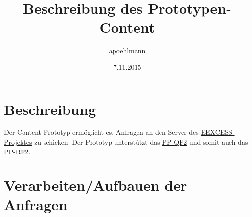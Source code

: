 
\title{Beschreibung des Prototypen-Content}
\author{apoehlmann}
\date{7.11.2015}


\pagebreak

\section{Beschreibung}
Der Content-Prototyp ermöglicht es, Anfragen an den Server des  
\href{https://github.com/EEXCESS/eexcess/wiki}{EEXCESS-Projektes} zu schicken.
Der Prototyp unterstützt das \href{https://github.com/EEXCESS/eexcess/wiki/%5B21.09.2015%5D-Request-and-Response-format#pp-query-format}{PP-QF2}
und somit auch das \href{https://github.com/EEXCESS/eexcess/wiki/%5B21.09.2015%5D-Request-and-Response-format#pp-response-format}{PP-RF2}.

\section{Verarbeiten/Aufbauen der Anfragen}
